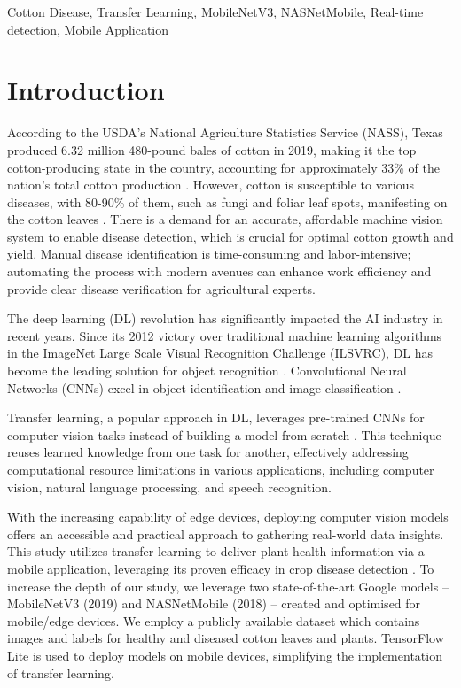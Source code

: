 \documentclass[conference]{IEEEtran}
\begin{document}
\begin{IEEEkeywords}
 Cotton Disease, Transfer Learning, MobileNetV3, NASNetMobile, Real-time detection, Mobile Application
\end{IEEEkeywords}

\section{Introduction}
According to the USDA's National Agriculture Statistics Service (NASS), Texas produced 6.32 million 480-pound bales of cotton in 2019, making it the top cotton-producing state in the country, accounting for approximately 33\% of the nation's total cotton production \cite{ USDA-NASS}. However, cotton is susceptible to various diseases, with 80-90\% of them, such as fungi and foliar leaf spots, manifesting on the cotton leaves \cite{Gulhane-Gurjar}. There is a demand for an accurate, affordable machine vision system to enable disease detection, which is crucial for optimal cotton growth and yield. Manual disease identification is time-consuming and labor-intensive; automating the process with modern avenues can enhance work efficiency and provide clear disease verification for agricultural experts.

The deep learning (DL) revolution has significantly impacted the AI industry in recent years. Since its 2012 victory over traditional machine learning algorithms in the ImageNet Large Scale Visual Recognition Challenge (ILSVRC), DL has become the leading solution for object recognition \cite{Ashqar-Naser}\cite{Gehlot-Saini}. Convolutional Neural Networks (CNNs) excel in object identification and image classification \cite{Sarangdhar-Pawar}.

Transfer learning, a popular approach in DL, leverages pre-trained CNNs for computer vision tasks instead of building a model from scratch \cite{Brownlee}. This technique reuses learned knowledge from one task for another, effectively addressing computational resource limitations in various applications, including computer vision, natural language processing, and speech recognition. 

With the increasing capability of edge devices, deploying computer vision models offers an accessible and practical approach to gathering real-world data insights. This study utilizes transfer learning to deliver plant health information via a mobile application, leveraging its proven efficacy in crop disease detection \cite{Disease Detection} \cite{Disease Diagnosing}. To increase the depth of our study, we leverage two state-of-the-art Google models -- MobileNetV3 (2019) and NASNetMobile (2018) \cite{WandB} -- created and optimised for mobile/edge devices. We employ a publicly available dataset \cite{Kaggle} which contains images and labels for healthy and diseased cotton leaves and plants. TensorFlow Lite is used to deploy models on mobile devices, simplifying the implementation of transfer learning.
\end{document}
